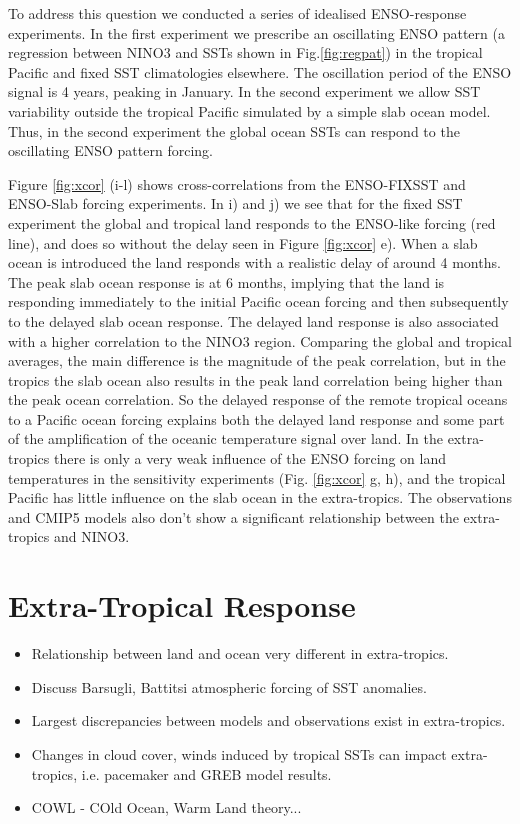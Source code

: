 To address this question we conducted a series of idealised ENSO-response 
experiments. In the first experiment we prescribe an oscillating ENSO pattern (a 
regression between NINO3 and SSTs shown in Fig.\ref{fig:regpat}) in the tropical 
Pacific and fixed SST climatologies elsewhere.  The oscillation period of the 
ENSO signal is 4 years, peaking in January. In the second experiment we allow 
SST variability outside the tropical Pacific simulated by a simple slab ocean 
model.  Thus, in the second experiment the global ocean SSTs can respond to the 
oscillating ENSO pattern forcing.

Figure \ref{fig:xcor} (i-l) shows cross-correlations from the ENSO-FIXSST and 
ENSO-Slab forcing experiments. In i) and j) we see that for the fixed SST 
experiment the global and tropical land responds to the ENSO-like forcing (red 
line), and does so without the delay seen in Figure \ref{fig:xcor} e). When a 
slab ocean is introduced the land responds with a realistic delay of around 4 
months.  The peak slab ocean response is at 6 months, implying that the land is 
responding immediately to the initial Pacific ocean forcing and then 
subsequently to the delayed slab ocean response. The delayed land response is 
also associated with a higher correlation to the NINO3 region. Comparing the 
global and tropical averages, the main difference is the magnitude of the peak 
correlation, but in the tropics the slab ocean also results in the peak land 
correlation being higher than the peak ocean correlation. So the delayed 
response of the remote tropical oceans to a Pacific ocean forcing explains both 
the delayed land response and some part of the amplification of the oceanic 
temperature signal over land. In the extra-tropics there is only a very weak 
influence of the ENSO forcing on land temperatures in the sensitivity 
experiments (Fig.  \ref{fig:xcor} g, h), and the tropical Pacific has little 
influence on the slab ocean in the extra-tropics. The observations and CMIP5 
models also don't show a significant relationship between the extra-tropics and 
NINO3.


\section{Extra-Tropical Response}
\begin{itemize}
	\item Relationship between land and ocean very different in extra-tropics.
	\item Discuss Barsugli, Battitsi atmospheric forcing of SST anomalies.
	\item Largest discrepancies between models and observations exist in 
		extra-tropics.
	\item Changes in cloud cover, winds induced by tropical SSTs can impact 
		extra-tropics, i.e. pacemaker and GREB model results.
	\item COWL - COld Ocean, Warm Land theory...
\end{itemize}

